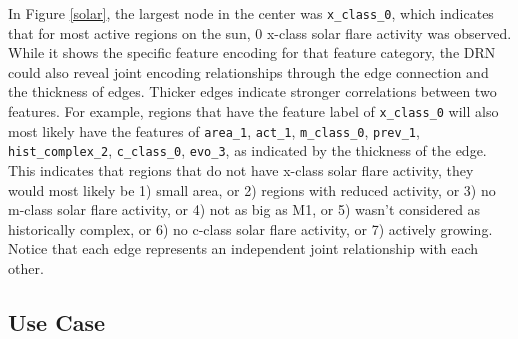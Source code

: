 In Figure \ref{solar}, the largest node in the center was \texttt{x\_class\_0}, which indicates that for most active regions on the sun, 0 x-class solar flare activity was observed. While it shows the specific feature encoding for that feature category, the DRN could also reveal joint encoding relationships through the edge connection and the thickness of edges. Thicker edges indicate stronger correlations between two features. For example, regions that have the feature label of \texttt{x\_class\_0} will also most likely have the features of \texttt{area\_1}, \texttt{act\_1}, \texttt{m\_class\_0}, \texttt{prev\_1}, \texttt{hist\_complex\_2}, \texttt{c\_class\_0}, \texttt{evo\_3}, as indicated by the thickness of the edge. This indicates that regions that do not have x-class solar flare activity, they would most likely be 1) small area, or 2) regions with reduced activity, or 3) no m-class solar flare activity, or 4) not as big as M1, or 5) wasn't considered as historically complex, or 6) no c-class solar flare activity, or 7) actively growing. Notice that each edge represents an independent joint relationship with each other.

\subsection{Use Case\label{Use Case}}
